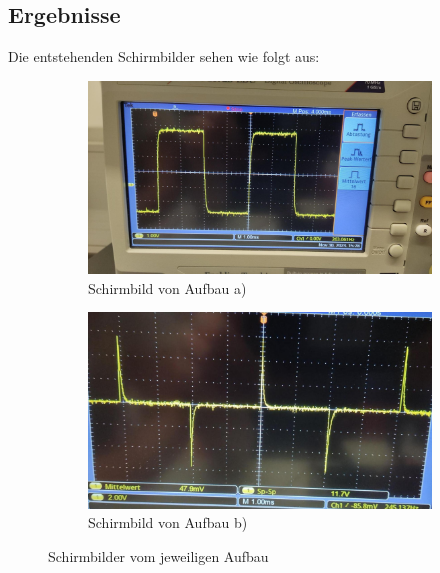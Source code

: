     \subsection{Ergebnisse}
        Die entstehenden Schirmbilder sehen wie folgt aus:
        
        \begin{figure}[H]
        	\begin{subfigure}{0.48\linewidth}
        		\includegraphics[width=\linewidth]{bilder/teila.png}
        		\caption{Schirmbild von Aufbau a)}
        		\label{fig:biold4}
        	\end{subfigure}
        	\hfill
        	\begin{subfigure}{0.48\linewidth}
        		\includegraphics[width=\linewidth]{bilder/teilb.png}
        		\caption{Schirmbild von Aufbau b)}
        		\label{fig:bild3}
        	\end{subfigure}
        	\caption{Schirmbilder vom jeweiligen Aufbau}
        	\label{fig:zwei-bilder-schirme}
        \end{figure}
        
